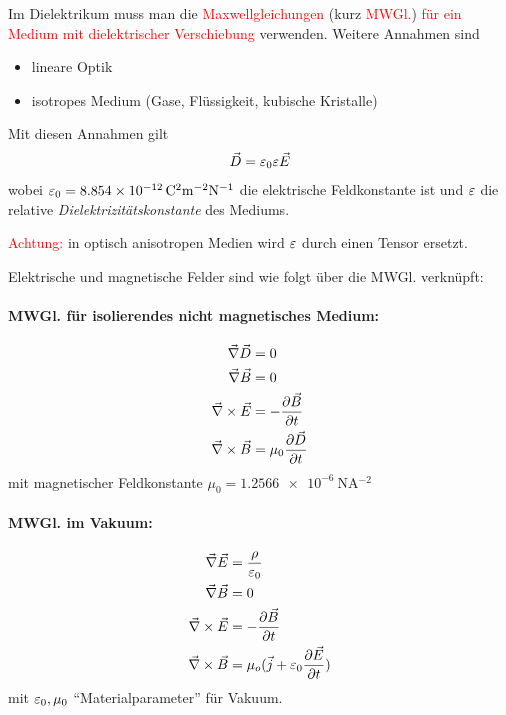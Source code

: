 Im Dielektrikum muss man die \textcolor{red}{Maxwellgleichungen} (kurz
\textcolor{red}{MWGl.}) \textcolor{red}{für ein Medium mit
  dielektrischer Verschiebung}%
verwenden. 
Weitere Annahmen sind
\begin{itemize}
	\item lineare Optik
	\item isotropes Medium (Gase, Flüssigkeit, kubische Kristalle)
\end{itemize}
Mit diesen Annahmen gilt
\begin{gather*}
	\vec{D}=\eps_0\eps\vec{E}
\end{gather*}%
%
%
%
%
wobei $\eps_0=\SI{8.854e-12}{\coulomb^2\m^{-2}\newton^{-1}}$
die elektrische Feldkonstante ist und
\emph{$\eps$} die relative \emph{Dielektrizitätskonstante}%
 des Mediums.

\textcolor{red}{Achtung:} in optisch anisotropen Medien wird
$\eps$ durch einen Tensor ersetzt.

 Elektrische und magnetische Felder sind wie folgt über die MWGl. verknüpft:
 \paragraph{MWGl. für isolierendes nicht magnetisches Medium:}
 \begin{align*}	 
 	\vecna\vec{D}&=0\\
 	\vecna\vec{B}&=0\\
 	\vecna\times\vec{E}&=-\dif[\vec{B}]{t}\\
 	\vecna\times\vecB&=\mu_0 \dif[\vec{D}]{t}
 \end{align*}%
%
mit magnetischer Feldkonstante 
$\mu_0=\SI{1.2566e-6}{\newton\ampere^{-2}}$%

\paragraph{MWGl. im Vakuum:}
\begin{align*}
	\vecna \vecE &=\frac{\rho}{\eps_0}\\
	\vecna\vecB&=0\\
	\vecna\times\vecE&=-\dif[\vecB]{t}\\
	\vecna\times\vecB&=\mu_o(\vec{j}+\eps_0\frac{\partial\vecE}{\partial t})
\end{align*}
mit $\eps_0,\mu_0$ \enquote{Materialparameter} für Vakuum.

